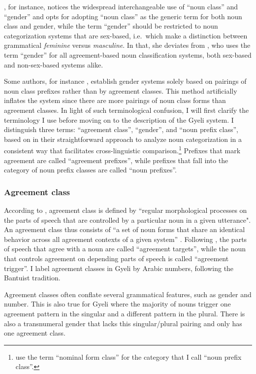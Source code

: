 \citet[19]{aikhenvald2003}, for instance, notices the widespread interchangeable use of ``noun class'' and ``gender'' and opts for adopting ``noun class'' as the generic term for both noun class and gender, while the term ``gender'' should be restricted to noun categorization systems that are sex-based, i.e.\ which make a distinction between grammatical {\itshape feminine} versus {\itshape masculine}. In that, she deviates from \citet{corbett91}, who uses the term ``gender'' for all agreement-based noun classification systems, both sex-based and non-sex-based systems alike.

Some authors, for instance \citet[85]{mve2011}, establish gender systems solely based on pairings of noun class prefixes rather than by agreement classes. This method artificially inflates the system since there are more pairings of noun class forms than agreement classes.
In light of such terminological confusion, I will first clarify the terminology I use before moving on to the description of the Gyeli system. I distinguish three terms:  ``agreement class'', ``gender'', and ``noun prefix class'', based on \citet{guldemann2019} in their straightforward approach to analyze noun categorization in a consistent way that facilitates cross-linguistic comparison.\footnote{\citet{guldemann2019} use the term ``nominal form class'' for the category that I call  ``noun prefix class''.} Prefixes that mark agreement are called ``agreement prefixes'', while prefixes that fall into the category of noun prefix classes are called ``noun prefixes''. 

\subsubsection*{Agreement class}  
According to \citet[13]{guldemann2000}, agreement class is defined by ``regular morphological processes on the parts of speech that are controlled by a particular noun in a given utterance". An agreement class thus consists of ``a set of noun forms that share an identical behavior across all agreement contexts of a given system'' \citep[98]{guldemann2019}. 
Following \citet{corbett91}, the parts of speech that agree with a noun are called ``agreement targets'', while the noun that controls agreement on depending parts of speech is called ``agreement trigger''. I label agreement classes in Gyeli by Arabic numbers, following the Bantuist tradition.

Agreement classes often conflate several grammatical features, such as gender and number. This is also true for Gyeli where the majority of nouns trigger one agreement pattern in the singular and a different pattern in the plural. There is also a transnumeral gender that lacks this singular/plural pairing and only has one agreement class. 

